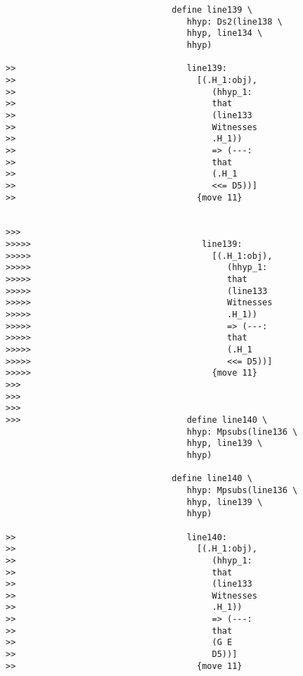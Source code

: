 \documentclass[12pt]{article}
\begin{document}
\begin{verbatim}
                                 define line139 \
                                    hhyp: Ds2(line138 \
                                    hhyp, line134 \
                                    hhyp)

>>                                  line139:
>>                                    [(.H_1:obj),
>>                                       (hhyp_1:
>>                                       that
>>                                       (line133
>>                                       Witnesses
>>                                       .H_1))
>>                                       => (---:
>>                                       that
>>                                       (.H_1
>>                                       <<= D5))]
>>                                    {move 11}


>>>
>>>>>                                  line139:
>>>>>                                    [(.H_1:obj),
>>>>>                                       (hhyp_1:
>>>>>                                       that
>>>>>                                       (line133
>>>>>                                       Witnesses
>>>>>                                       .H_1))
>>>>>                                       => (---:
>>>>>                                       that
>>>>>                                       (.H_1
>>>>>                                       <<= D5))]
>>>>>                                    {move 11}
>>>
>>>
>>>
>>>                                 define line140 \
                                    hhyp: Mpsubs(line136 \
                                    hhyp, line139 \
                                    hhyp)

                                 define line140 \
                                    hhyp: Mpsubs(line136 \
                                    hhyp, line139 \
                                    hhyp)

>>                                  line140:
>>                                    [(.H_1:obj),
>>                                       (hhyp_1:
>>                                       that
>>                                       (line133
>>                                       Witnesses
>>                                       .H_1))
>>                                       => (---:
>>                                       that
>>                                       (G E
>>                                       D5))]
>>                                    {move 11}



\end{verbatim}
\end{document}
